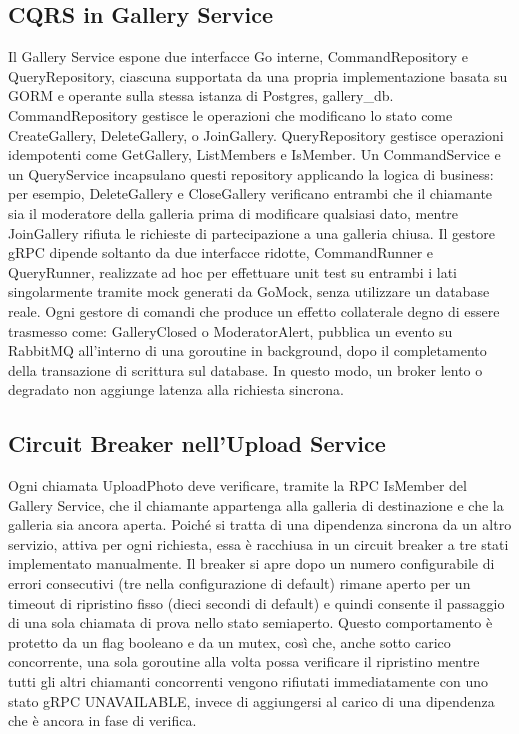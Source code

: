 \documentclass[conference]{IEEEtran}
\begin{document}
\subsection{CQRS in Gallery Service}
Il Gallery Service espone due interfacce Go interne, CommandRepository e QueryRepository, ciascuna supportata da una propria implementazione basata su GORM e operante sulla stessa istanza di Postgres, gallery\_db. CommandRepository gestisce le operazioni che modificano lo stato come CreateGallery, DeleteGallery, o JoinGallery. QueryRepository gestisce operazioni idempotenti come GetGallery, ListMembers e IsMember. Un CommandService e un QueryService incapsulano questi repository applicando la logica di business: per esempio, DeleteGallery e CloseGallery verificano entrambi che il chiamante sia il moderatore della galleria prima di modificare qualsiasi dato, mentre JoinGallery rifiuta le richieste di partecipazione a una galleria chiusa. Il gestore gRPC dipende soltanto da due interfacce ridotte, CommandRunner e QueryRunner, realizzate ad hoc per effettuare unit test su entrambi i lati singolarmente tramite mock generati da GoMock, senza utilizzare un database reale. Ogni gestore di comandi che produce un effetto collaterale degno di essere trasmesso come: GalleryClosed o ModeratorAlert, pubblica un evento su RabbitMQ all’interno di una goroutine in background, dopo il completamento della transazione di scrittura sul database. In questo modo, un broker lento o degradato non aggiunge latenza alla richiesta sincrona.
\subsection{Circuit Breaker nell'Upload Service}
Ogni chiamata UploadPhoto deve verificare, tramite la RPC IsMember del Gallery Service, che il chiamante appartenga alla galleria di destinazione e che la galleria sia ancora aperta. Poiché si tratta di una dipendenza sincrona da un altro servizio, attiva per ogni richiesta, essa è racchiusa in un circuit breaker a tre stati implementato manualmente. Il breaker si apre dopo un numero configurabile di errori consecutivi (tre nella configurazione di default) rimane aperto per un timeout di ripristino fisso (dieci secondi di default) e quindi consente il passaggio di una sola chiamata di prova nello stato semiaperto. Questo comportamento è protetto da un flag booleano e da un mutex, così che, anche sotto carico concorrente, una sola goroutine alla volta possa verificare il ripristino mentre tutti gli altri chiamanti concorrenti vengono rifiutati immediatamente con uno stato gRPC UNAVAILABLE, invece di aggiungersi al carico di una dipendenza che è ancora in fase di verifica.
\end{document}
